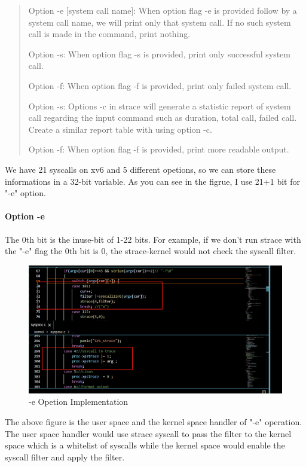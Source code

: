 \documentclass[11pt,oneside,a4paper]{article}
\begin{document}
\begin{quotation}
    Option -e [system call name]:
    When option flag -e is provided follow by a system call name, we will print only that
    system call. If no such system call is made in the command, print nothing.

    Option -s:
    When option flag -s is provided, print only successful system call.

    Option -f:
    When option flag -f is provided, print only failed system call.

    Option -s:
    Options -c in strace will generate a statistic report of system call regarding the input command
    such as duration, total call, failed call. Create a similar report table with using option -c.

    Option -f:
    When option flag -f is provided, print more readable output.

\end{quotation}

We have 21 syscalls on xv6 and 5 different opetions, so we can store these informations
in a 32-bit variable. As you can see in the figrue, I use 21+1 bit for "-e" option. 


\paragraph*{Option -e}
The 0th bit is the inuse-bit of 1-22 bits. For example, if we don't run strace with
the "-e" flag the 0th bit is 0, the strace-kernel would not check the syscall filter.

\begin{figure}[H]
    \includegraphics[width=4.75in]{1-20.png}
    \centering
    \caption{-e Opetion Implementation}
\end{figure}

The above figure is the user space and the kernel space handler of "-e" operation.
The user space handler would use strace syscall to pass the filter to the kernel space 
which is a whitelist of syscalls while the kernel space would enable the syscall filter 
and apply the filter. 
\end{document}

